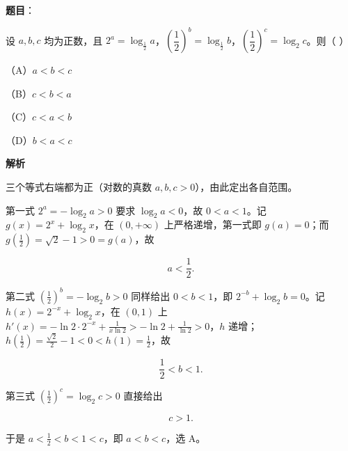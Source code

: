 \begin{answer}

\textbf{题目}：

设 $a,b,c$ 均为正数，且 $2^a=\log_{\frac12}a$，$\left(\dfrac{1}{2}\right)^b=\log_{\frac12}b$，$\left(\dfrac{1}{2}\right)^c=\log_2 c$。则（ ）

（A）$a<b<c$

（B）$c<b<a$

（C）$c<a<b$

（D）$b<a<c$

\textbf{解析}

三个等式右端都为正（对数的真数 $a,b,c>0$），由此定出各自范围。

第一式 $2^a=-\log_2a>0$ 要求 $\log_2a<0$，故 $0<a<1$。记 $g(x)=2^x+\log_2x$，在 $(0,+\infty)$ 上严格递增，第一式即 $g(a)=0$；而 $g\left(\frac12\right)=\sqrt2-1>0=g(a)$，故

\nopagebreak[4]
\[a<\frac12 .\]

第二式 $\left(\frac12\right)^b=-\log_2b>0$ 同样给出 $0<b<1$，即 $2^{-b}+\log_2b=0$。记 $h(x)=2^{-x}+\log_2x$，在 $(0,1)$ 上 $h'(x)=-\ln2\cdot2^{-x}+\frac1{x\ln2}>-\ln2+\frac1{\ln2}>0$，$h$ 递增；$h\left(\frac12\right)=\frac{\sqrt2}2-1<0<h(1)=\frac12$，故

\nopagebreak[4]
\[\frac12<b<1 .\]

第三式 $\left(\frac12\right)^c=\log_2c>0$ 直接给出

\nopagebreak[4]
\[c>1 .\]

于是 $a<\frac12<b<1<c$，即 $a<b<c$，选 A。


\end{answer}
